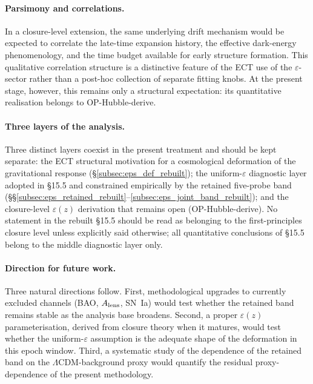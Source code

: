 \paragraph{Parsimony and correlations.}
In a closure-level extension, the same underlying drift mechanism
would be expected to correlate the late-time expansion history, the
effective dark-energy phenomenology, and the time budget available
for early structure formation. This qualitative correlation structure
is a distinctive feature of the ECT use of the $\varepsilon$-sector
rather than a post-hoc collection of separate fitting knobs. At the
present stage, however, this remains only a structural expectation:
its quantitative realisation belongs to OP-Hubble-derive.

\paragraph{Three layers of the analysis.}
Three distinct layers coexist in the present treatment and should be
kept separate: the ECT structural motivation for a cosmological
deformation of the gravitational response
(\S\ref{subsec:eps_def_rebuilt}); the uniform-$\varepsilon$ diagnostic
layer adopted in \S15.5 and constrained empirically by the retained
five-probe band
(\S\S\ref{subsec:eps_retained_rebuilt}--\ref{subsec:eps_joint_band_rebuilt});
and the closure-level $\varepsilon(z)$ derivation that remains open
(OP-Hubble-derive). No statement in the rebuilt \S15.5 should be read
as belonging to the first-principles closure level unless explicitly
said otherwise; all quantitative conclusions of \S15.5 belong to the
middle diagnostic layer only.

\paragraph{Direction for future work.}
Three natural directions follow. First, methodological upgrades to
currently excluded channels (BAO, $A_{\rm lens}$, SN~Ia) would test
whether the retained band remains stable as the analysis base
broadens. Second, a proper $\varepsilon(z)$ parameterisation, derived
from closure theory when it matures, would test whether the
uniform-$\varepsilon$ assumption is the adequate shape of the
deformation in this epoch window. Third, a systematic study of the
dependence of the retained band on the $\Lambda$CDM-background proxy
would quantify the residual proxy-dependence of the present
methodology.

